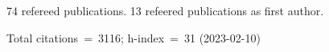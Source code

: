 74 refereed publications. 13 refeered publications as first author.

Total citations~=~3116; h-index~=~31 (2023-02-10)